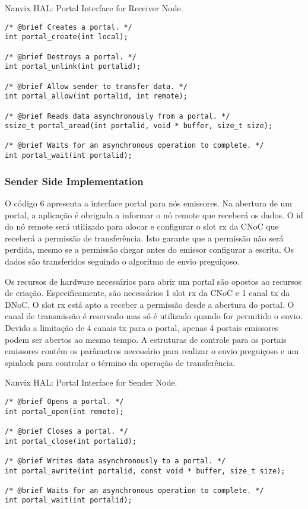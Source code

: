 \begin{listing}[!tb]
\caption{Nanvix HAL: Portal Interface for Receiver Node.}
\label{code:hal-portal-receiver}
\begin{verbatim}
/* @brief Creates a portal. */
int portal_create(int local);

/* @brief Destroys a portal. */
int portal_unlink(int portalid);

/* @brief Allow sender to transfer data. */
int portal_allow(int portalid, int remote);

/* @brief Reads data asynchronously from a portal. */
ssize_t portal_aread(int portalid, void * buffer, size_t size);

/* @brief Waits for an asynchronous operation to complete. */
int portal_wait(int portalid);
\end{verbatim}
\end{listing}

			\subsubsection{Sender Side Implementation}

				O código 6 apresenta a interface portal para nós emissores.
				Na abertura de um portal, a aplicação é obrigada a informar o nó remote que receberá os dados.
				O id do nó remote será utilizado para alocar e configurar o slot rx da CNoC que receberá a permissão de transferência.
				Isto garante que a permissão não será perdida, mesmo se a permissão chegar antes do emissor configurar a escrita.
				Os dados são transferidos seguindo o algoritmo de envio preguiçoso.

				Os recursos de hardware necessários para abrir um portal são opostos ao recursos de criação.
				Especificamente, são necessários 1 slot rx da CNoC e 1 canal tx da DNoC.
				O slot rx está apto a receber a permissão desde a abertura do portal.
				O canal de transmissão é reservado mas só é utilizado quando for permitido o envio.
				Devido a limitação de 4 canais tx para o portal, apenas 4 portais emissores podem ser abertos ao mesmo tempo.
				A estruturas de controle para os portais emissores contém os parâmetros necessário para realizar o envio preguiçoso e um spinlock para controlar o término da operação de transferência.

\begin{listing}[!tb]
\caption{Nanvix HAL: Portal Interface for Sender Node.}
\label{code:hal-portal-sender}
\begin{verbatim}
/* @brief Opens a portal. */
int portal_open(int remote);

/* @brief Closes a portal. */
int portal_close(int portalid);

/* @brief Writes data asynchronously to a portal. */
int portal_awrite(int portalid, const void * buffer, size_t size);

/* @brief Waits for an asynchronous operation to complete. */
int portal_wait(int portalid);
\end{verbatim}
\end{listing}

